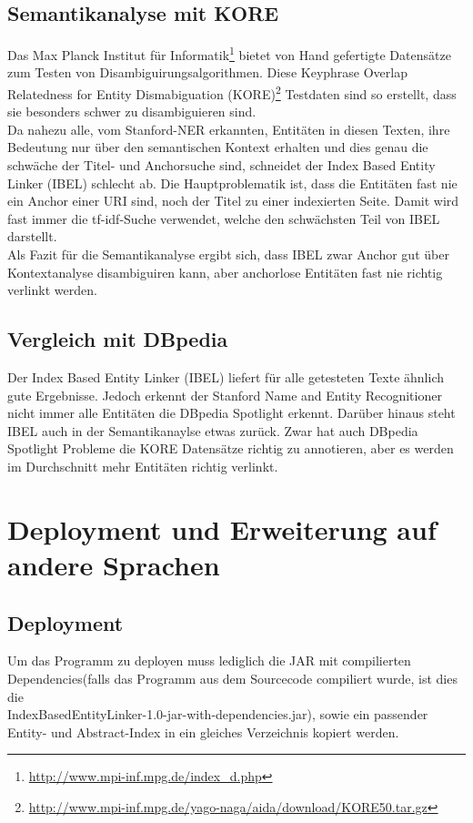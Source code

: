 \documentclass[11pt, a4paper, oneside]{Thesis} %
\begin{document}
\section{Semantikanalyse mit KORE}
Das Max Planck Institut f\"ur Informatik\footnote{\url{http://www.mpi-inf.mpg.de/index\_d.php}} bietet von Hand gefertigte Datens\"atze zum Testen von Disambiguirungsalgorithmen. Diese Keyphrase Overlap Relatedness for Entity Dismabiguation (KORE)\footnote{\url{http://www.mpi-inf.mpg.de/yago-naga/aida/download/KORE50.tar.gz}} Testdaten sind so erstellt, dass sie besonders schwer zu disambiguieren sind. \\
Da nahezu alle, vom Stanford-NER erkannten, Entit\"aten in diesen Texten, ihre Bedeutung nur \"uber den semantischen Kontext erhalten und dies genau die schw\"ache der Titel- und Anchorsuche sind, schneidet der Index Based Entity Linker (IBEL) schlecht ab.  Die Hauptproblematik ist, dass die Entit\"aten fast nie ein Anchor einer URI sind, noch der Titel zu einer indexierten Seite. Damit wird fast immer die tf-idf-Suche verwendet, welche den schw\"achsten Teil von IBEL darstellt.\\
Als Fazit f\"ur die Semantikanalyse ergibt sich, dass IBEL zwar Anchor gut \"uber Kontextanalyse disambiguiren kann, aber anchorlose Entit\"aten fast nie  
richtig verlinkt werden.

\section{Vergleich mit DBpedia}
Der Index Based Entity Linker (IBEL) liefert f\"ur alle getesteten Texte \"ahnlich gute Ergebnisse. Jedoch erkennt der Stanford Name and Entity Recognitioner nicht immer alle Entit\"aten die DBpedia Spotlight erkennt. Dar\"uber hinaus steht IBEL auch in der Semantikanaylse etwas zur\"uck. Zwar hat auch DBpedia Spotlight Probleme die KORE Datens\"atze richtig zu annotieren, aber es werden im Durchschnitt mehr Entit\"aten richtig verlinkt.


\chapter{Deployment und Erweiterung auf andere Sprachen}
\label{Kapitel 5} %

\section{Deployment}
Um das Programm zu deployen muss lediglich die JAR mit compilierten Dependencies(falls das Programm aus dem Sourcecode compiliert wurde, ist dies die \\\grqq IndexBasedEntityLinker-1.0-jar-with-dependencies.jar\grqq), sowie ein passender Entity- und Abstract-Index in ein gleiches Verzeichnis kopiert werden.
\end{document}
